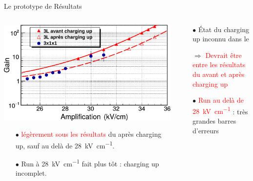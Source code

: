     \begin{frame}{Le prototype de \TOO{}}{Résultats}
        \begin{scriptsize}
            \begin{columns}
                \begin{column}{0.5\textwidth}
                    \includegraphics[width=\textwidth]{./pictures/gain_vs_ampli.pdf} \\ 
                    \begin{itemize}
                        \item[$\bullet$] \TOO{} \textcolor{red}{légèrement sous les résultats} du \threeL{} après charging up, sauf au delà de \SI{28}{\kilo\volt\per\centi\meter}.
                        \item[$\bullet$] Run à \SI{28}{\kilo\volt\per\centi\meter} fait plus tôt : charging up incomplet.
                    \end{itemize}
                \end{column}
                \begin{column}{0.5\textwidth}
                    \begin{itemize}
                        \item[$\bullet$] État du charging up inconnu dans le \TOO{}
                        \item[$\Rightarrow$]  \textcolor{red}{Devrait être entre les résultats du \threeL{} avant et après charging up}
                    \end{itemize}
                    \begin{itemize}
                        \item[$\bullet$] \textcolor{red}{Run au delà de \SI{28}{\kilo\volt\per\centi\meter}} : très grandes barres  d'erreurs 
                           \begin{itemize}

\end{itemize}
\end{itemize}
\end{column}
\end{columns}
\end{scriptsize}
\end{frame}
